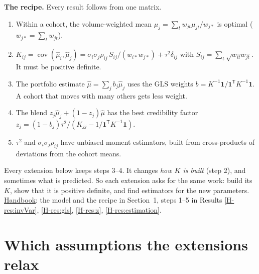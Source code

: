 \documentclass[10pt]{article}
\newcommand{\site}{https://mikaelandblom-coder.github.io/credible-lean/}
\newcommand{\hb}[1]{\ref*{H-#1}}
\newcommand{\Handbook}{\href{\site handbook.pdf}{Handbook}}
\newcommand{\hmu}{\hat\mu}
\newcommand{\cov}{\operatorname{cov}}
\newcommand{\bu}{\mathbf 1}
\begin{document}
\textbf{The recipe.} Every result follows from one matrix.
\begin{enumerate}\setlength{\itemsep}{1pt}
  \item Within a cohort, the volume-weighted mean $\hmu_j = \sum_t w_{jt}\mu_{jt} / w_{j\ast}$ is
    optimal ($w_{j\ast} = \sum_t w_{jt}$).
  \item $K_{ij} = \cov(\hmu_i, \hmu_j) = \sigma_i\sigma_j\rho_{ij}\,S_{ij}/(w_{i\ast}w_{j\ast}) +
    \tau^2\delta_{ij}$ with $S_{ij} = \sum_t \sqrt{w_{it}w_{jt}}$. It must be positive definite.
  \item The portfolio estimate $\hmu = \sum_j b_j\hmu_j$ uses the GLS weights
    $b = K^{-1}\bu / \bu^{\mathsf T}K^{-1}\bu$. A cohort that moves with many others gets less weight.
  \item The blend $z_j\hmu_j + (1 - z_j)\hmu$ has the best credibility factor
    $z_j = (1 - b_j)\tau^2 / (K_{jj} - 1/\bu^{\mathsf T}K^{-1}\bu)$.
  \item $\tau^2$ and $\sigma_i\sigma_j\rho_{ij}$ have unbiased moment estimators, built from
    cross-products of deviations from the cohort means.
\end{enumerate}
Every extension below keeps steps 3--4. It changes \emph{how $K$ is built} (step 2), and sometimes
what is predicted. So each extension asks for the same work: build its $K$, show that it is
positive definite, and find estimators for the new parameters. \Handbook: the model and the recipe
in Section~1, steps 1--5 in Results \hb{res:invVar}, \hb{res:gls}, \hb{res:z},
\hb{res:estimation}.

\section{Which assumptions the extensions relax}
\end{document}
